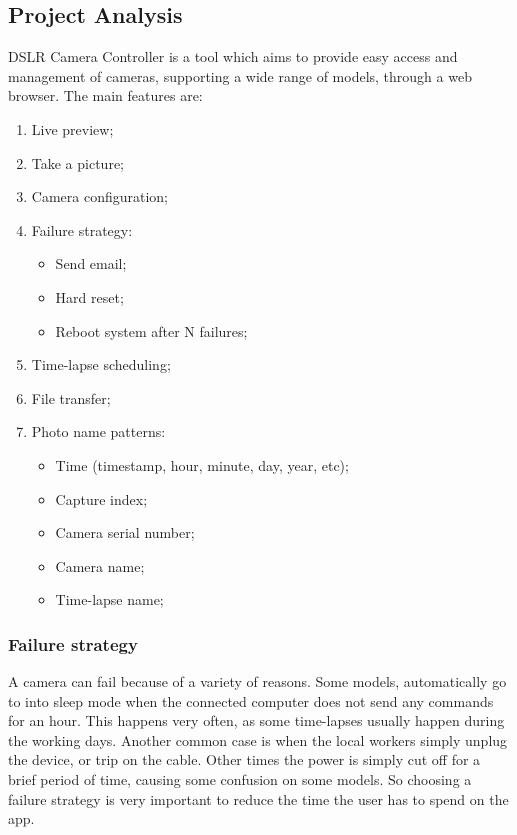 \subsection{Project Analysis}
DSLR Camera Controller is a tool which aims to provide easy access and management of cameras, supporting a wide range of models, through a web browser. The main features are:
\begin{enumerate}
    \item Live preview;
    \item Take a picture;
    \item Camera configuration;
    \item Failure strategy:
    \begin{itemize}
        \item Send email;
        \item Hard reset;
        \item Reboot system after N failures;
    \end{itemize}
    \item Time-lapse scheduling;
    \item File transfer;
    \item Photo name patterns:
    \begin{itemize}
        \item Time (timestamp, hour, minute, day, year, etc);
        \item Capture index;
        \item Camera serial number;
        \item Camera name;
        \item Time-lapse name;
    \end{itemize}
\end{enumerate}

\subsubsection{Failure strategy}
A camera can fail because of a variety of reasons. Some models, automatically go to into sleep mode when the connected computer does not send any commands for an hour. This happens very often, as some time-lapses usually happen during the working days. Another common case is when the local workers simply unplug the device, or trip on the cable. Other times the power is simply cut off for a brief period of time, causing some confusion on some models. So choosing a failure strategy is very important to reduce the time the user has to spend on the app.

